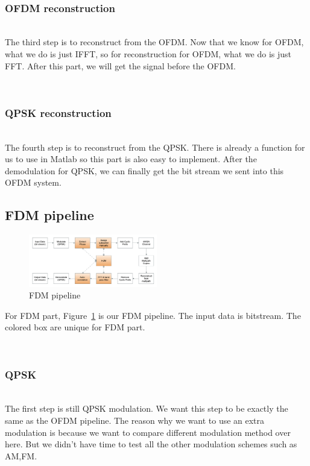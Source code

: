 \documentclass[twocolumn,conference]{IEEEtran}
\begin{document}
    \hfill\\\subsubsection{OFDM reconstruction}\hfill\\
    \indent The third step is to reconstruct from the OFDM. Now that we know for OFDM, what we do is just IFFT, so for reconstruction for OFDM, what we do is just FFT. After this part, we will get the signal before the OFDM.

    \hfill\\\subsubsection{QPSK reconstruction}\hfill\\
    \indent The fourth step is to reconstruct from the QPSK. There is already a function for us to use in Matlab so this part is also easy to implement. After the demodulation for QPSK, we can finally get the bit stream we sent into this OFDM system.

\subsection{FDM pipeline}
\begin{figure}[h]
    \centering
    \includegraphics[width=0.5\textwidth]{./asset/FDM_pipeline}
    \caption{FDM pipeline}
    \label{fig:FDM_pipeline}
\end{figure}
For FDM part, Figure~\ref{fig:FDM_pipeline} is our FDM pipeline. The input data is bitstream. The colored box are unique for FDM part.

\hfill\\\subsubsection{QPSK}\hfill\\
    \indent The first step is still QPSK modulation. We want this step to be exactly the same as the OFDM pipeline. The reason why we want to use an extra modulation is because we want to compare different modulation method over here. But we didn’t have time to test all the other modulation schemes such as AM,FM.
\end{document}

